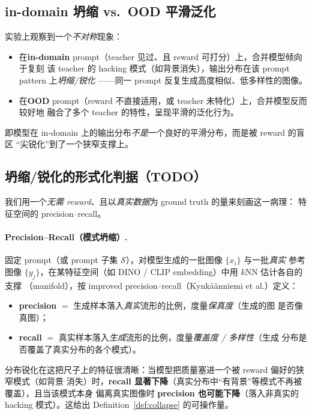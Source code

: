 \documentclass[11pt,a4paper]{article}
\theoremstyle{definition}
\begin{document}
\subsection{in-domain 坍缩 vs.\ OOD 平滑泛化}
\label{ssec:collapse}

实验上观察到一个\emph{不对称}现象：
\begin{itemize}[leftmargin=1.5em]
\item 在\textbf{in-domain} prompt（teacher 见过、且 reward 可打分）上，合并模型倾向于复刻
该 teacher 的 hacking 模式（如背景消失），输出分布在该 prompt pattern 上\emph{坍缩/锐化}
——同一 prompt 反复生成高度相似、低多样性的图像。
\item 在\textbf{OOD} prompt（reward 不直接适用，或 teacher 未特化）上，合并模型反而较好地
融合了多个 teacher 的特性，呈现平滑的泛化行为。
\end{itemize}
即模型在 in-domain 上的输出分布\emph{不是}一个良好的平滑分布，而是被 reward 的盲区
``尖锐化''到了一个狭窄支撑上。

\subsection{坍缩/锐化的形式化判据（TODO）}
\label{ssec:formal_collapse}

我们用一个\emph{无需 reward}、且以\emph{真实数据}为 ground truth 的量来刻画这一病理：
特征空间的 precision--recall。

\paragraph{Precision--Recall（模式坍缩）.}
固定 prompt（或 prompt 子集 $\mathcal{S}$），对模型生成的一批图像 $\{x_i\}$ 与一批\emph{真实}
参考图像 $\{y_j\}$，在某特征空间（如 DINO / CLIP embedding）中用 $k$NN 估计各自的支撑
（manifold），按 improved precision--recall（Kynkäänniemi et al.）定义：
\begin{itemize}[leftmargin=1.5em]
\item \textbf{precision} $=$ 生成样本落入\emph{真实}流形的比例，度量\emph{保真度}（生成的图
是否像真图）；
\item \textbf{recall} $=$ 真实样本落入\emph{生成}流形的比例，度量\emph{覆盖度 / 多样性}（生成
分布是否覆盖了真实分布的各个模式）。
\end{itemize}
分布锐化在这把尺子上的特征很清晰：当模型把质量塞进一个被 reward 偏好的狭窄模式（如背景
消失）时，\textbf{recall 显著下降}（真实分布中``有背景''等模式不再被覆盖），且当该模式本身
偏离真实图像时 \textbf{precision 也可能下降}（落入非真实的 hacking 模式）。这给出
Definition~\ref{def:collapse} 的可操作量。
\end{document}
